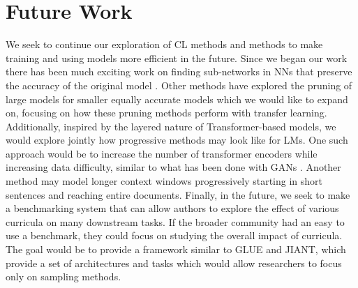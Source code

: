 \chapter{Future Work}
\label{chap:future}
We seek to continue our exploration of CL methods and methods to make training and using models more efficient in the future. Since we began our work there has been much exciting work on finding sub-networks in NNs that preserve the accuracy of the original model \cite{Frankle2019TheLT}. Other methods have explored the pruning of large models for smaller equally accurate models \cite{Han2016DeepCC} \cite{Yu2017ScalpelCD} \cite{Wynter2020OptimalSE} which we would like to expand on, focusing on how these pruning methods perform with transfer learning. Additionally, inspired by the layered nature of Transformer-based models, we would explore jointly how progressive methods may look like for LMs. One such approach would be to increase the number of transformer encoders while increasing data difficulty, similar to what has been done with GANs \cite{Karras2017ProgressiveGO}. Another method may model longer context windows progressively starting in short sentences and reaching entire documents. Finally, in the future, we seek to make a benchmarking system that can allow authors to explore the effect of various curricula on many downstream tasks. If the broader community had an easy to use a benchmark, they could focus on studying the overall impact of curricula.  The goal would be to provide a framework similar to GLUE and JIANT, which provide a set of architectures and tasks which would allow researchers to focus only on sampling methods.